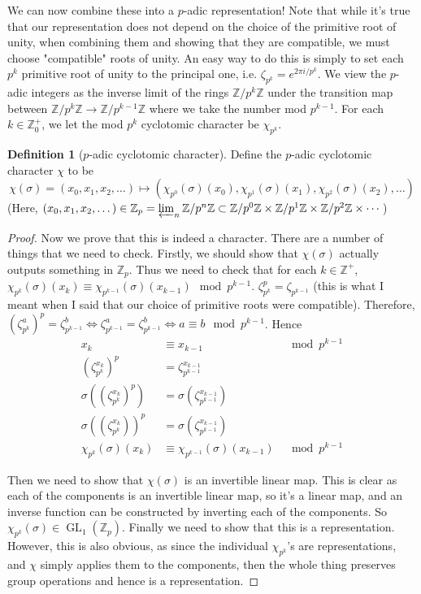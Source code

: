 \documentclass{article}
\theoremstyle{definition}
\newtheorem{definition}{Definition}[section]
\theoremstyle{definition}
\theoremstyle{definition}
\newcommand{\Z}{\mathbb{Z}}
\begin{document}
We can now combine these into a $p$-adic representation! Note that while it's true that our representation does not depend on the choice of the primitive root of unity, when combining them and showing that they are compatible, we must choose "compatible" roots of unity. An easy way to do this is simply to set each $p^k$ primitive root of unity to the principal one, i.e. $\zeta_{p^k}=e^{2\pi i/p^k}$.
\newline\newline
We view the $p$-adic integers as the inverse limit of the rings $\Z/p^k\Z$ under the transition map between $\Z/p^k\Z\to\Z/p^{k-1}\Z$ where we take the number mod $p^{k-1}$. For each $k\in\Z^+_0$, we let the mod $p^k$ cyclotomic character be $\chi_{p^k}$.
\begin{definition}[$p$-adic cyclotomic character]
   Define the $p$-adic cyclotomic character $\chi$ to be
   $$\chi(\sigma)=(x_0,x_1,x_2,\dots)\mapsto(\chi_{p^0}(\sigma)(x_0),\chi_{p^1}(\sigma)(x_1),\chi_{p^2}(\sigma)(x_2),\dots)$$
   (Here, $(x_0,x_1,x_2,\dots)\in \Z_p=\varprojlim_n \Z/p^n\Z\subset \Z/p^0\Z\times\Z/p^1\Z\times\Z/p^2\Z\times\cdots$)
\end{definition}
\begin{proof}
Now we prove that this is indeed a character. There are a number of things that we need to check. Firstly, we should show that $\chi(\sigma)$ actually outputs something in $\Z_p$. Thus we need to check that for each $k\in\Z^+$, $\chi_{p^k}(\sigma)(x_k)\equiv\chi_{p^{k-1}}(\sigma)(x_{k-1})\mod{p^{k-1}}$.
\newline\newline
$\zeta_{p^k}^p=\zeta_{p^{k-1}}$ (this is what I meant when I said that our choice of primitive roots were compatible). Therefore, $\left(\zeta_{p^k}^a\right)^p=\zeta_{p^{k-1}}^b\iff \zeta_{p^{k-1}}^a=\zeta_{p^{k-1}}^b\iff a\equiv b\mod{p^{k-1}}$. Hence
\begin{align*}
   x_k&\equiv x_{k-1 }&\mod{p^{k-1}}\\
   (\zeta_{p^k}^{x_k})^p&=\zeta_{p^{k-1}}^{x_{k-1}}\\
   \sigma((\zeta_{p^k}^{x_k})^p)&=\sigma(\zeta_{p^{k-1}}^{x_{k-1}})\\
   \sigma((\zeta_{p^k}^{x_k}))^p&=\sigma(\zeta_{p^{k-1}}^{x_{k-1}})\\
   \chi_{p^k}(\sigma)(x_k)&\equiv\chi_{p^{k-1}}(\sigma)(x_{k-1})&\mod{p^{k-1}}
\end{align*}

Then we need to show that $\chi(\sigma)$ is an invertible linear map. This is clear as each of the components is an invertible linear map, so it's a linear map, and an inverse function can be constructed by inverting each of the components. So $\chi_{p^k}(\sigma)\in\operatorname{GL}_1(\Z_p)$.
\newline\newline
Finally we need to show that this is a representation. However, this is also obvious, as since the individual $\chi_{p^k}$'s are representations, and $\chi$ simply applies them to the components, then the whole thing preserves group operations and hence is a representation.
\end{proof}
\end{document}
